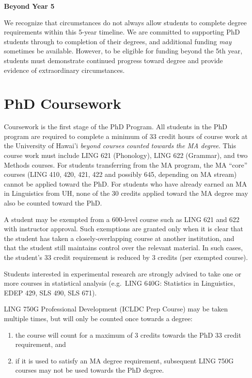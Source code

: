 \documentclass[
]{book}
\providecommand{\tightlist}{%
  \setlength{\itemsep}{0pt}\setlength{\parskip}{0pt}}
\begin{document}
\textbf{Beyond Year 5}

We recognize that circumstances do not always allow students to complete degree requirements within this 5-year timeline. We are committed to supporting PhD students through to completion of their degrees, and additional funding \emph{may} sometimes be available. However, to be eligible for funding beyond the 5th year, students must demonstrate continued progress toward degree and provide evidence of extraordinary circumstances.

\chapter{PhD Coursework}\label{phdcoursework}

Coursework is the first stage of the PhD Program. All students in the PhD program are required to complete a minimum of 33 credit hours of course work at the University of Hawai'i \emph{beyond courses counted towards the MA degree}. This course work must include LING 621 (Phonology), LING 622 (Grammar), and two Methods courses. For students transferring from the MA program, the MA ``core'' courses (LING 410, 420, 421, 422 and possibly 645, depending on MA stream) cannot be applied toward the PhD. For students who have already earned an MA in Linguistics from UH, none of the 30 credits applied toward the MA degree may also be counted toward the PhD.

A student may be exempted from a 600-level course such as LING 621 and 622 with instructor approval. Such exemptions are granted only when it is clear that the student has taken a closely-overlapping course at another institution, and that the student still maintains control over the relevant material. In such cases, the student's 33 credit requirement is reduced by 3 credits (per exempted course).

Students interested in experimental research are strongly advised to take one or more courses in statistical analysis (e.g.~LING 640G: Statistics in Linguistics, EDEP 429, SLS 490, SLS 671).

LING 750G Professional Development (ICLDC Prep Course) may be taken multiple times, but will only be counted once towards a degree:

\begin{enumerate}
\def\labelenumi{\roman{enumi}.}
\tightlist
\item
  the course will count for a maximum of 3 credits towards the PhD 33 credit requirement, and
\item
  if it is used to satisfy an MA degree requirement, subsequent LING 750G courses may not be used towards the PhD degree.
\end{enumerate}
\end{document}
